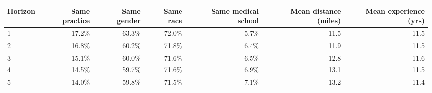\begin{table}[!h]
\centering
\begin{tabular}{lrrrrrr}
\toprule
Horizon & Same practice & Same gender & Same race & Same medical school & Mean distance (miles) & Mean experience (yrs)\\
\midrule
1 & 17.2\% & 63.3\% & 72.0\% & 5.7\% & 11.5 & 11.5\\
2 & 16.8\% & 60.2\% & 71.8\% & 6.4\% & 11.9 & 11.5\\
3 & 15.1\% & 60.0\% & 71.6\% & 6.5\% & 12.8 & 11.6\\
4 & 14.5\% & 59.7\% & 71.6\% & 6.9\% & 13.1 & 11.5\\
5 & 14.0\% & 59.8\% & 71.5\% & 7.1\% & 13.2 & 11.4\\
\bottomrule
\end{tabular}
\end{table}
